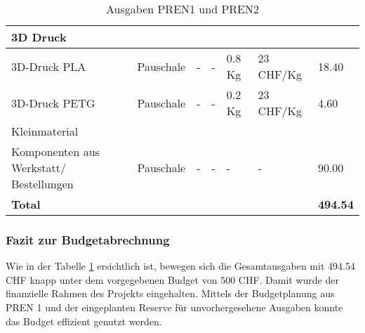 \documentclass[main.tex]{subfiles} %
\begin{document}
\begin{table}[htbp]
{\begin{tabular}{|p{3cm}|p{2.5cm}|p{2.5cm}|p{3cm}|p{1cm}|p{1.5cm}|p{1cm}|}
            \rowcolor{lightgray} 3D Druck           &                    &                              &                         &                 &                           &                            \\ \hline
            3D-Druck PLA                            & Pauschale          & -                            & -                       & 0.8 Kg          & 23 CHF/Kg                 & 18.40                          \\ \hline
            3D-Druck PETG                           & Pauschale          & -                            & -                       & 0.2 Kg          & 23 CHF/Kg                 & 4.60                         \\ \hline
            \rowcolor{lightgray} Kleinmaterial      &                    &                              &                         &                 &                           &                             \\ \hline
            Komponenten aus Werkstatt/ Bestellungen & Pauschale          & -                            & -                       & -               & -                         & 90.00                          \\ \hline
            \textbf{Total}                          &                    &                              &                         &                 &                           & \textbf{494.54}             \\ \hline
        \end{tabular}
    }
    \caption{Ausgaben PREN1 und PREN2}
    \label{tab:Ausgaben_PREN}
\end{table}

\subsubsection{Fazit zur Budgetabrechnung}
Wie in der Tabelle \ref{tab:Ausgaben_PREN} ersichtlich ist, bewegen sich die Gesamtausgaben mit 494.54 CHF knapp unter dem vorgegebenen Budget von 500 CHF. Damit wurde der
finanzielle Rahmen des Projekts eingehalten. Mittels der Budgetplanung aus PREN 1 und der eingeplanten Reserve für unvorhergesehene Ausgaben
konnte das Budget effizient genutzt werden.
\end{document}
